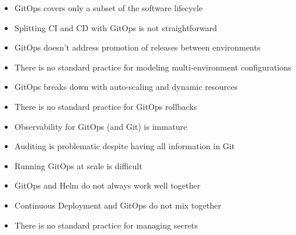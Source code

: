 \begin{itemize}
	\item GitOps covers only a subset of the software lifecycle
	\item Splitting CI and CD with GitOps is not straightforward
	\item GitOps doesn’t address promotion of releases between environments
	\item There is no standard practice for modeling multi-environment configurations
	\item GitOps breaks down with auto-scaling and dynamic resources
	\item There is no standard practice for GitOps rollbacks
	\item Observability for GitOps (and Git) is immature
	\item Auditing is problematic despite having all information in Git
	\item Running GitOps at scale is difficult
	\item GitOps and Helm do not always work well together
	\item Continuous Deployment and GitOps do not mix together
	\item There is no standard practice for managing secrets
\end{itemize}

\noindent
\autocite{codefreshGitopsPains10}
\bigskip




